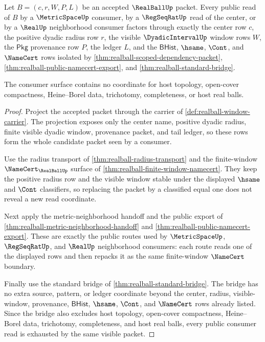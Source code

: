 \begin{theorem}
\label{thm:realball-finite-window-consumer-coverage}
Let $B=(c,r,W,P,L)$ be an accepted $\RealBallUp$ packet. Every public read of
$B$ by a $\MetricSpaceUp$ consumer, by a $\RegSeqRatUp$ read of the center, or
by a $\RealUp$ neighborhood consumer factors through exactly the center row
$c$, the positive dyadic radius row $r$, the visible $\DyadicIntervalUp$ window
rows $W$, the $\mathsf{Pkg}$ provenance row $P$, the ledger $L$, and the
$\mathsf{BHist}$, $\hsame$, $\Cont$, and $\NameCert$ rows isolated by
\autoref{thm:realball-scoped-dependency-packet},
\autoref{thm:realball-public-namecert-export}, and
\autoref{thm:realball-standard-bridge}.

The consumer surface contains no coordinate for host topology, open-cover
compactness, Heine--Borel data, trichotomy, completeness, or host real balls.
\end{theorem}
\begin{proof}
Project the accepted packet through the carrier of
\autoref{def:realball-window-carrier}. The projection exposes only the center
name, positive dyadic radius, finite visible dyadic window, provenance packet,
and tail ledger, so these rows form the whole candidate packet seen by a
consumer.

Use the radius transport of \autoref{thm:realball-radius-transport} and the
finite-window $\NameCert_{\RealBallUp}$ surface of
\autoref{thm:realball-finite-window-namecert}. They keep the positive radius
row and the visible window stable under the displayed $\hsame$ and $\Cont$
classifiers, so replacing the packet by a classified equal one does not reveal a
new read coordinate.

Next apply the metric-neighborhood handoff and the public export of
\autoref{thm:realball-metric-neighborhood-handoff} and
\autoref{thm:realball-public-namecert-export}. These are exactly the public
routes used by $\MetricSpaceUp$, $\RegSeqRatUp$, and $\RealUp$ neighborhood
consumers: each route reads one of the displayed rows and then repacks it as
the same finite-window $\NameCert$ boundary.

Finally use the standard bridge of \autoref{thm:realball-standard-bridge}. The
bridge has no extra source, pattern, or ledger coordinate beyond the center,
radius, visible-window, provenance, $\mathsf{BHist}$, $\hsame$, $\Cont$, and
$\NameCert$ rows already listed. Since the bridge also excludes host topology,
open-cover compactness, Heine--Borel data, trichotomy, completeness, and host
real balls, every public consumer read is exhausted by the same visible packet.
\end{proof}

